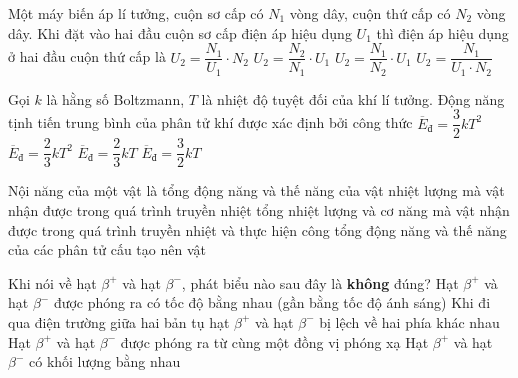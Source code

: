 	\begin{ex}%
		Một máy biến áp lí tưởng, cuộn sơ cấp có $N_1$ vòng dây, cuộn thứ cấp có $N_2$ vòng dây. Khi đặt vào hai đầu cuộn sơ cấp điện áp hiệu dụng $U_1$ thì điện áp hiệu dụng ở hai đầu cuộn thứ cấp là
		\choice
		{$U_2=\dfrac{N_1}{U_1}\cdot N_2$}
		{\True $U_2=\dfrac{N_2}{N_1}\cdot U_1$}
		{$U_2=\dfrac{N_1}{N_2}\cdot U_1$}
		{$U_2=\dfrac{N_1}{U_1\cdot N_2}$}
	\end{ex}

	\begin{ex}%
		Gọi $k$ là hằng số Boltzmann, $T$ là nhiệt độ tuyệt đối của khí lí tưởng. Động năng tịnh tiến trung bình của phân tử khí được xác định bởi công thức
		\choice
		{$\overline{E}_{\text{đ}}=\dfrac{3}{2}kT^2$}
		{$\overline{E}_{\text{đ}}=\dfrac{2}{3}kT^2$}
		{$\overline{E}_{\text{đ}}=\dfrac{2}{3}kT$}
		{\True $\overline{E}_{\text{đ}}=\dfrac{3}{2}kT$}
	\end{ex}

	\begin{ex}%
		Nội năng của một vật là
		\choice
		{tổng động năng và thế năng của vật}
		{nhiệt lượng mà vật nhận được trong quá trình truyền nhiệt}
		{tổng nhiệt lượng và cơ năng mà vật nhận được trong quá trình truyền nhiệt và thực hiện công}
		{\True tổng động năng và thế năng của các phân tử cấu tạo nên vật}
	\end{ex}

	\begin{ex}%
		Khi nói về hạt $\beta^{+}$ và hạt $\beta^{-}$, phát biểu nào sau đây là \textbf{không} đúng?
		\choice
		{Hạt $\beta^{+}$ và hạt $\beta^{-}$ được phóng ra có tốc độ bằng nhau (gần bằng tốc độ ánh sáng)}
		{Khi đi qua điện trường giữa hai bản tụ hạt $\beta^{+}$ và hạt $\beta^{-}$ bị lệch về hai phía khác nhau}
		{\True Hạt $\beta^{+}$ và hạt $\beta^{-}$ được phóng ra từ cùng một đồng vị phóng xạ}
		{Hạt $\beta^{+}$ và hạt $\beta^{-}$ có khối lượng bằng nhau}
	\end{ex}

